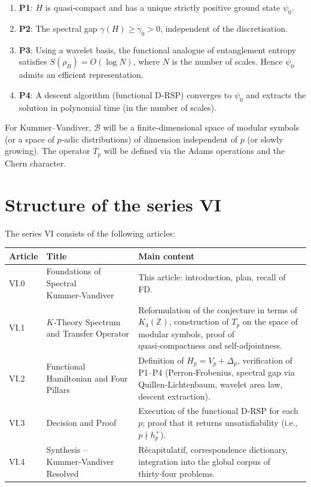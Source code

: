 \documentclass[11pt,a4paper]{article}
\begin{document}
\begin{enumerate}
\item \textbf{P1}: $H$ is quasi‑compact and has a unique strictly positive ground state $\psi_0$.
\item \textbf{P2}: The spectral gap $\gamma(H) \ge \gamma_0 > 0$, independent of the discretisation.
\item \textbf{P3}: Using a wavelet basis, the functional analogue of entanglement entropy satisfies $S(\rho_B) = O(\log N)$, where $N$ is the number of scales. Hence $\psi_0$ admits an efficient representation.
\item \textbf{P4}: A descent algorithm (functional D‑RSP) converges to $\psi_0$ and extracts the solution in polynomial time (in the number of scales).
\end{enumerate}

For Kummer–Vandiver, $\mathcal{B}$ will be a finite‑dimensional space of modular symbols (or a space of $p$‑adic distributions) of dimension independent of $p$ (or slowly growing). The operator $T_p$ will be defined via the Adams operations and the Chern character.

\section{Structure of the series VI}

The series VI consists of the following articles:

\begin{center}
\begin{tabular}{@{}llp{8cm}@{}}
\toprule
\textbf{Article} & \textbf{Title} & \textbf{Main content} \\
\midrule
VI.0 & Foundations of Spectral Kummer‑Vandiver & This article: introduction, plan, recall of FD. \\
VI.1 & $K$‑Theory Spectrum and Transfer Operator & Reformulation of the conjecture in terms of $K_4(\mathbb{Z})$, construction of $T_p$ on the space of modular symbols, proof of quasi‑compactness and self‑adjointness. \\
VI.2 & Functional Hamiltonian and Four Pillars & Definition of $H_p = V_p + \Delta_p$, verification of P1–P4 (Perron‑Frobenius, spectral gap via Quillen‑Lichtenbaum, wavelet area law, descent extraction). \\
VI.3 & Decision and Proof & Execution of the functional D‑RSP for each $p$; proof that it returns unsatisfiability (i.e., $p \nmid h_p^+$). \\
VI.4 & Synthesis – Kummer‑Vandiver Resolved & Récapitulatif, correspondence dictionary, integration into the global corpus of thirty‑four problems. \\
\bottomrule
\end{tabular}
\end{center}
\end{document}
